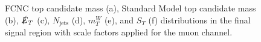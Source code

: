 \begin{figure}[]
\hfil  %
\caption{FCNC top candidate mass (a), Standard Model top candidate mass (b), $\slashed{E}_T$ (c), $N_\text{jets}$ (d),  $m_T^W$ (e), and $S_T$ (f) distributions in the final signal region with scale factors applied for the muon channel.}
\label{fig:SRmuj2}
\end{figure}


